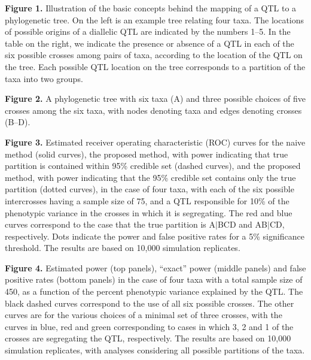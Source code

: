 \documentclass[12pt,letterpaper]{article}
\newenvironment{hanging}
{\begin{list}{}
        {\setlength{\labelwidth}{0in}
         \setlength{\leftmargin}{1em}
         \setlength{\itemindent}{-1em}
        }
}
{\end{list}}
\begin{document}
\begin{hanging}

\item \textbf{Figure 1.} 
  Illustration of the basic concepts behind the mapping of a QTL to a
  phylogenetic tree.  On the left is an example tree relating four
  taxa.  The locations of possible origins of a diallelic QTL are
  indicated by the numbers 1--5.  In the table on the right, we
  indicate the presence or absence of a QTL in each of the six
  possible crosses among pairs of taxa, according to the location of
  the QTL on the tree.  Each possible QTL location on the tree
  corresponds to a partition of the taxa into two groups.

\item \textbf{Figure 2.}
  A phylogenetic tree with six taxa (A) and three possible choices of
  five crosses among the six taxa, with nodes denoting taxa and edges
  denoting crosses (B--D).  

\item \textbf{Figure 3.}
  Estimated receiver operating characteristic (ROC) curves for the
  naive method (solid curves), the proposed method, with power
  indicating that true
  partition is contained within 95\% credible
  set (dashed curves), and the proposed method, with power indicating
  that the 95\% credible set contains only the true partition (dotted curves), 
  in the case of four taxa, with each of the six possible intercrosses
  having a sample size of 75, and a QTL responsible for 10\% of the
  phenotypic variance in the crosses in which it is segregating.  The
  red and blue curves correspond to the case that the true partition is
  A$|$BCD and AB$|$CD, respectively.  Dots indicate the power and
  false positive rates for a 5\% significance threshold.  The results are based on
  10,000 simulation replicates.


\item \textbf{Figure 4.}
  Estimated power (top panels), ``exact'' power (middle panels) and
  false positive rates (bottom panels) in the case of four taxa with a
  total sample size of 450, as a function of the percent phenotypic
  variance explained by the QTL.  The black dashed curves correspond to
  the use of all six possible crosses.  The other curves are for the
  various choices of a minimal set of three crosses, with the curves
  in blue, red and green corresponding to cases in which 3, 2 and 1 of
  the crosses are segregating the QTL, respectively.  The results are
  based on 10,000 simulation replicates, with analyses considering all
  possible partitions of the taxa.



\end{hanging}
\end{document}
